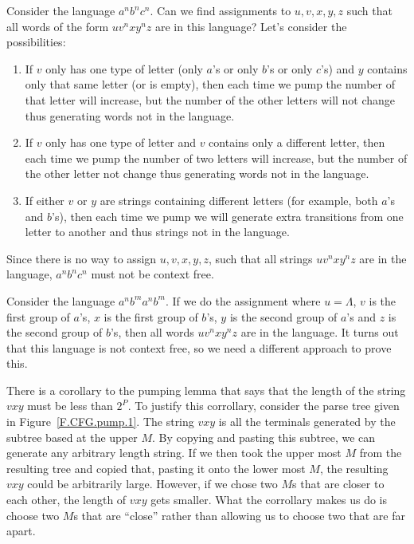 \documentclass[letterpaper,12pt,openany,reqno]{book}%
\begin{document}
Consider the language $a^nb^nc^n$. Can we find assignments to $u,v,x,y,z$ such that all words of the form $uv^nxy^nz$ are in this language? Let's consider the possibilities:
\begin{enumerate}
\item If $v$ only has one type of letter (only $a$'s or only $b$'s or only $c$'s) and $y$ contains only that same letter (or is empty), then each time we pump the number of that letter will increase, but the number of the other letters will not change thus generating words not in the language.
\item If $v$ only has one type of letter and $v$ contains only a different letter, then each time we pump the number of two letters will increase, but the number of the other letter not change thus generating words not in the language.
\item If either $v$ or $y$ are strings containing different letters (for example, both $a$'s and $b$'s), then each time we pump we will generate extra transitions from one letter to another and thus strings not in the language.
\end{enumerate}
Since there is no way to assign $u,v,x,y,z$, such that all strings $uv^nxy^nz$ are in the language, $a^nb^nc^n$ must not be context free.

Consider the language $a^nb^ma^nb^m$. If we do the assignment where $u=\Lambda$, $v$ is the first group of $a$'s, $x$ is the first group of $b$'s, $y$ is the second group of $a$'s and $z$ is the second group of $b$'s, then all words $uv^nxy^nz$ are in the language. It turns out that this language is not context free, so we need a different approach to prove this.

There is a corollary to the pumping lemma that says that the length of the string $vxy$ must be less than $2^P$. To justify this corrollary, consider the parse tree given in Figure~\ref{F.CFG.pump.1}. The string $vxy$ is all the terminals generated by the subtree based at the upper $M$. By copying and pasting this subtree, we can generate any arbitrary length string. If we then took the upper most $M$ from the resulting tree and copied that, pasting it onto the lower most $M$, the resulting $vxy$ could be arbitrarily large. However, if we chose two $M$s that are closer to each other, the length of $vxy$ gets smaller. What the corrollary makes us do is choose two $M$s that are ``close'' rather than allowing us to choose two that are far apart.
\end{document}
